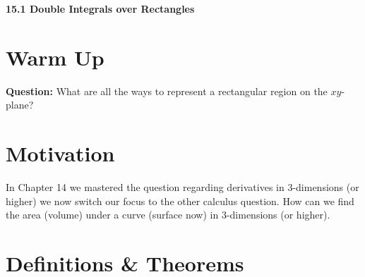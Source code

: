 \documentclass[11pt]{article}
\newcommand{\vs}{\vspace*{.1in}}
\begin{document}
\begin{LARGE}\begin{center}\bf 15.1 Double Integrals over Rectangles\end{center}
\end{LARGE}

\vs\vs



\section{Warm Up}
\textbf{Question:} What are all the ways to represent a rectangular region on the $xy$-plane?



\section{Motivation}

In Chapter 14 we mastered the question regarding derivatives in 3-dimensions (or higher) we now switch our focus to the other calculus question. How can we find the area (volume) under a curve (surface now) in 3-dimensions (or higher).


\section{Definitions \& Theorems}
\end{document}
